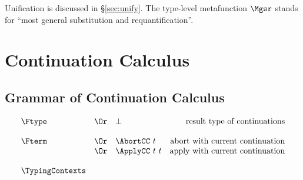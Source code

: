\documentclass{amsart}
\begin{document}
\nc{}

\nc{}

\nc{}

\nc{}

\nc{}

\Tautology

\SuperIntroduction

\SuperElimination

Unification is discussed in \S\ref{sec:unify}. The type-level
metafunction $\Mgsr$ stands for ``most general substitution and
requantification''.

\ExistentialIntroduction

\section{Continuation Calculus}

\subsection{Grammar of Continuation Calculus}

\nc{}

\[
\begin{array}{lclr}
\Ftype
&\Or& \bot & \mbox{result type of continuations} \\
\\
\Fterm
&\Or& \AbortCC~t & \mbox{abort with current continuation} \\
&\Or& \ApplyCC~t~t & \mbox{apply with current continuation} \\
\\
\TypingContexts
\end{array}
\]
\end{document}
